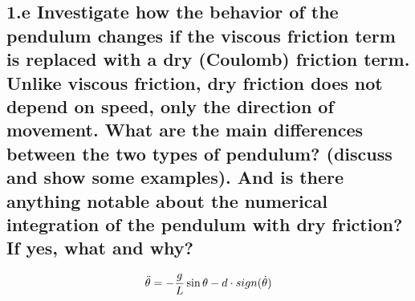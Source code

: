 \documentclass{cmc}
\begin{document}
\subsection*{1.e Investigate how the behavior of the pendulum changes if the
  viscous friction term is replaced with a dry (Coulomb) friction term. Unlike
  viscous friction, dry friction does not depend on speed, only the direction of
  movement. What are the main differences between the two types of pendulum?
  (discuss and show some examples). And is there anything notable about the
  numerical integration of the pendulum with dry friction? If yes, what and why?}

\begin{equation}
  \label{eq:ode-pendulum-dry}
  \ddot{\theta} = - {g \over L} \sin \theta - d \cdot sign(\dot{\theta})
\end{equation}
\end{document}
